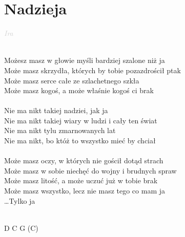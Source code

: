 \documentclass[a5paper, 10pt]{book}
\begin{document}
\section{Nadzieja}\textcolor{lightgray}{\textit{Ira}}\\~\\
\begin{minipage}[t]{0.8\textwidth}
Możesz masz w głowie myśli bardziej szalone niż ja\\
Może masz skrzydła, których by tobie pozazdrościł ptak\\
Może masz serce całe ze szlachetnego szkła\\
Może masz kogoś, a może właśnie kogoś ci brak\\
\\
\hspace*{5mm}Nie ma nikt takiej nadziei, jak ja\\
\hspace*{5mm}Nie ma nikt takiej wiary w ludzi i cały ten świat\\
\hspace*{5mm}Nie ma nikt tylu zmarnowanych lat\\
\hspace*{5mm}Nie ma nikt, bo któż to wszystko mieć by chciał\\
\\
Może masz oczy, w których nie gościł dotąd strach\\
Może masz w sobie niechęć do wojny i brudnych spraw\\
Może masz litość, a może uczuć już w tobie brak\\
Może masz wszystko, lecz nie masz tego co mam ja\\

…Tylko ja\\
\\
\end{minipage}
\begin{minipage}[t]{0.2\textwidth}
D C G (C)\\
\end{minipage}

\newpage
\end{document}
